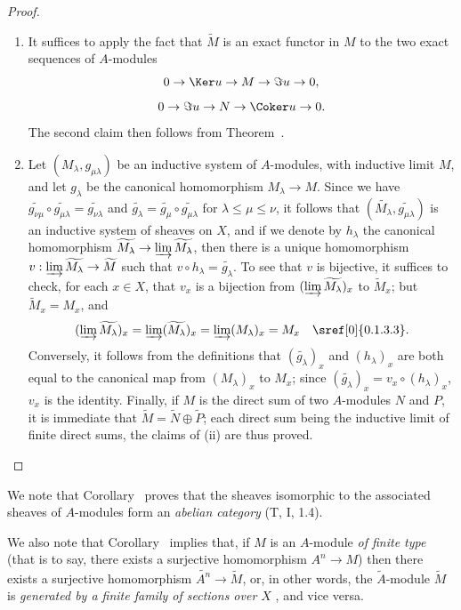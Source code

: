 \begin{proof}
\medskip\noindent
\begin{enumerate}
  \item[(i)] It suffices to apply the fact that $\widetilde{M}$ is an exact functor in $M$  to the two exact sequences of $A$-modules
    \[
      0\to\Ker u\to M\to\Im u\to 0,
    \]
    \[
      0\to\Im u\to N\to\Coker u\to 0.
    \]
    The second claim then follows from Theorem~.
  \item[(ii)] Let $(M_\lambda,g_{\mu\lambda})$ be an inductive system of $A$-modules, with inductive limit $M$, and let $g_\lambda$ be the canonical homomorphism $M_\lambda\to M$.
    Since we have $\widetilde{g_{\nu\mu}}\circ\widetilde{g_{\mu\lambda}}=\widetilde{g_{\nu\lambda}}$ and $\widetilde{g_\lambda}=\widetilde{g_\mu}\circ\widetilde{g_{\mu\lambda}}$ for $\lambda\leq\mu\leq\nu$, it follows that $(\widetilde{M_\lambda},\widetilde{g_{\mu\lambda}})$ is an inductive system of sheaves on $X$, and if we denote by $h_\lambda$ the canonical homomorphism $\widetilde{M_\lambda}\to\varinjlim\widetilde{M_\lambda}$, then there is a unique homomorphism $v:\varinjlim\widetilde{M_\lambda}\to\widetilde{M}$ such that $v\circ h_\lambda=\widetilde{g_\lambda}$.
    To see that $v$ is bijective, it suffices to check, for each $x\in X$, that $v_x$ is a bijection from $(\varinjlim\widetilde{M_\lambda})_x$ to $\widetilde{M}_x$;
    but $\widetilde{M}_x=M_x$, and
    \[
      (\varinjlim\widetilde{M_\lambda})_x=\varinjlim(\widetilde{M_\lambda})_x
      =\varinjlim(M_\lambda)_x=M_x\quad\sref[0]{0.1.3.3}.
    \]
    Conversely, it follows from the definitions that $(\widetilde{g_\lambda})_x$ and
    $(h_\lambda)_x$ are both equal to the canonical map from $(M_\lambda)_x$ to $M_x$;
    since $(\widetilde{g_\lambda})_x=v_x\circ(h_\lambda)_x$, $v_x$ is the identity.
    Finally, if $M$ is the direct sum of two $A$-modules $N$ and $P$, it is immediate that $\widetilde{M}=\widetilde{N}\oplus\widetilde{P}$;
    each direct sum being the inductive limit of finite direct sums, the claims of (ii) are thus proved.
\end{enumerate}
\end{proof}

We note that Corollary~ proves that the sheaves isomorphic to the associated sheaves of $A$-modules form an \emph{abelian category} (T, I, 1.4).

We also note that Corollary~ implies that, if $M$ is an $A$-module \emph{of finite type} (that is to say, there exists a surjective homomorphism $A^n\to M$) then there exists a surjective homomorphism $\widetilde{A^n}\to\widetilde{M}$, or, in other words, the $\widetilde{A}$-module $\widetilde{M}$ is \emph{generated by a finite family of sections over $X$} , and vice versa.

